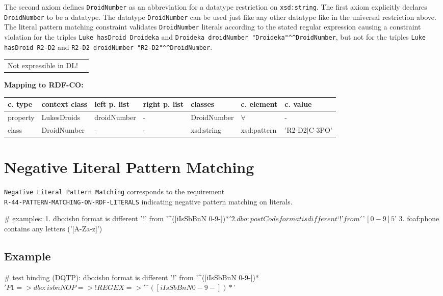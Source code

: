 \documentclass{llncs}
\newcommand{\ms}[1]{\texttt{#1}}
\newenvironment{gcotable}{
  \scriptsize
  \sffamily
  \vspace{0cm}
	\begin{center}
	\textbf{\vspace{0.4cm}Mapping to RDF-CO:} \\
  \begin{tabular}{l|l|l|l|l|l|l}
	\hline
  \textbf{c. type} & \textbf{context class} & \textbf{left p. list} & \textbf{right p. list} & \textbf{classes} & \textbf{c. element} & \textbf{c. value} \\
  \hline

}{
  \hline
  \end{tabular}
	\end{center}
}
\newenvironment{DL}{
  \vspace{0cm}
	\begin{center}
  \begin{tabular}{r l}

}{
  \end{tabular}
	\end{center}
}
\begin{document}
The second axiom defines \ms{DroidNumber} as an abbreviation for a datatype restriction on \ms{xsd:string}. 
The first axiom explicitly declares \ms{DroidNumber} to be a datatype. 
The datatype \ms{DroidNumber} can be used just like any other datatype like in the universal restriction above.
The literal pattern matching constraint validates \ms{DroidNumber} literals according to the stated regular expression causing a constraint violation for the triples 
\ms{Luke hasDroid Droideka} and \ms{Droideka droidNumber "Droideka"\textasciicircum{}\textasciicircum{}DroidNumber}, 
but not for the triples \ms{Luke hasDroid R2-D2} and \ms{R2-D2 droidNumber "R2-D2"\textasciicircum{}\textasciicircum{}DroidNumber}.

\begin{DL}
Not expressible in DL!
\end{DL}

\begin{gcotable}
property & LukesDroids & droidNumber & - & DroidNumber & $\forall$ & - \\
class & DroidNumber & - & - & xsd:string & xsd:pattern & 'R2-D2$|$C-3PO' \\
\end{gcotable}

\section{Negative Literal Pattern Matching}

\ms{Negative Literal Pattern Matching} corresponds to the requirement \\
\ms{R-44-PATTERN-MATCHING-ON-RDF-LITERALS}
indicating negative pattern matching on literals.

\begin{ex}
# examples:
1. dbo:isbn format is different ’!’ from '^([iIsSbBnN 0-9-])*$'
2. dbo:postCode format is different ‘!’ from 'ˆ[0-9]{5}$'
3. foaf:phone contains any letters ('[A-Za-z]')
\end{ex}

\subsection{Example}

\begin{ex}
# test binding (DQTP):
dbo:isbn format is different ’!’ from '^([iIsSbBnN 0-9-])*$'

P1 => dbo:isbn
NOP => !
REGEX => 'ˆ([iIsSbBnN 0-9-])*$'
\end{ex}
\end{document}
